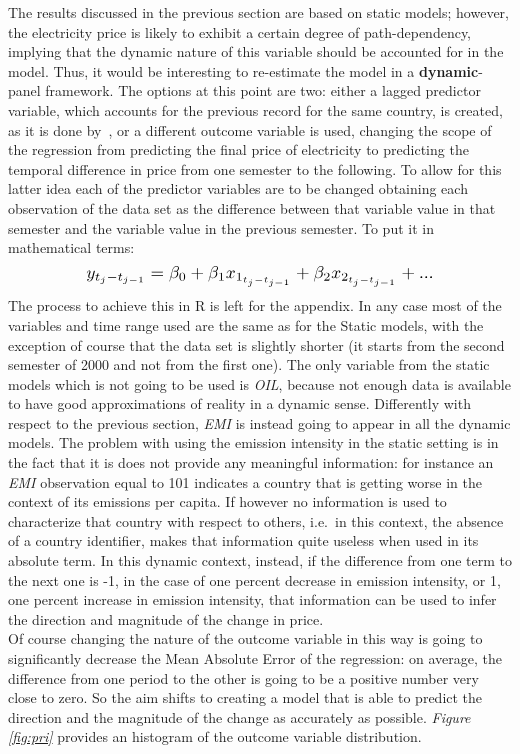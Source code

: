 \documentclass[a4paper,12pt]{book}
\begin{document}
The results discussed in the previous section are based on static models; however, the electricity price is likely to exhibit a certain degree of path-dependency, implying that the dynamic nature of this variable should be accounted for in the model. Thus, it would be interesting to re-estimate the model in a \textbf{dynamic}-panel framework. The options at this point are two: either a lagged predictor variable, which accounts for the previous record for the same country, is created, as it is done by~\cite{hyland2016restructuring}, or a different outcome variable is used, changing the scope of the regression from predicting the final price of electricity to predicting the temporal difference in price from one semester to the following. To allow for this latter idea each of the predictor variables are to be changed obtaining each observation of the data set as the difference between that variable value in that semester and the variable value in the previous semester. To put it in mathematical terms: $$ \scalebox{1.25}{$y_{t_j-t_{j-1}} = \beta_0 + \beta_1 x_{1_{t_j - t_{j-1}}} + \beta_2 x_{2_{t_j - t_{j-1}}} + ...$}$$ The process to achieve this in R is left for the appendix. In any case most of the variables and time range used are the same as for the Static models, with the exception of course that the data set is slightly shorter (it starts from the second semester of 2000 and not from the first one). The only variable from the static models which is not going to be used is \textit{OIL}, because not enough data is available to have good approximations of reality in a dynamic sense. Differently with respect to the previous section, \textit{EMI} is instead going to appear in all the dynamic models. The problem with using the emission intensity in the static setting is in the fact that it is does not provide any meaningful information: for instance an \textit{EMI} observation equal to 101 indicates a country that is getting worse in the context of its emissions per capita. If however no information is used to characterize that country with respect to others, i.e.\ in this context, the absence of a country identifier, makes that information quite useless when used in its absolute term. In this dynamic context, instead, if the difference from one term to the next one is -1, in the case of one percent decrease in emission intensity, or 1, one percent increase in emission intensity, that information can be used to infer the direction and magnitude of the change in price.\\

Of course changing the nature of the outcome variable in this way is going to significantly decrease the Mean Absolute Error of the regression: on average, the difference from one period to the other is going to be a positive number very close to zero. So the aim shifts to creating a model that is able to predict the direction and the magnitude of the change as accurately as possible. \textit{Figure \ref{fig:pri}} provides an histogram of the outcome variable distribution.
\end{document}
